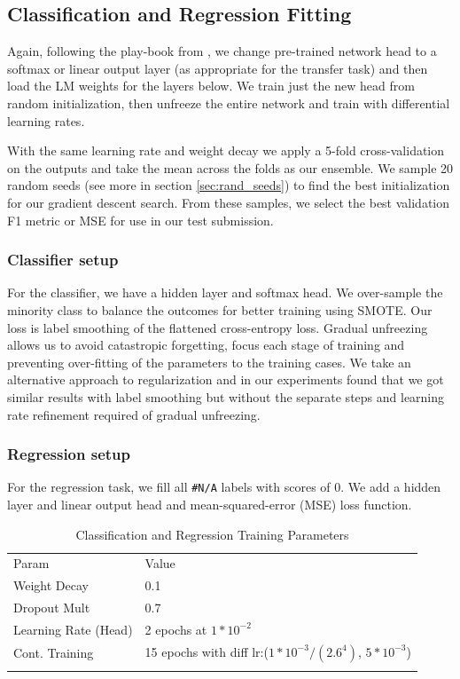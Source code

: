 \documentclass[runningheads]{llncs}
\begin{document}
\subsection{Classification and Regression Fitting}
Again, following the play-book from \cite{HowardRuder:DBLP:journals/corr/abs-1801-06146}, we change pre-trained network head to a softmax or linear output layer (as appropriate for the transfer task) and then load the LM weights for the layers below.  We train just the new head from random initialization, then unfreeze the entire network and train with differential learning rates.

With the same learning rate and weight decay we apply a 5-fold cross-validation on the outputs and take the mean across the folds as our ensemble.  We sample 20 random seeds (see more in section \ref{sec:rand_seeds}) to find the best initialization for our gradient descent search.  From these samples, we select the best validation F1 metric or MSE for use in our test submission.
\subsubsection{Classifier setup}  For the classifier, we have a hidden layer and softmax head.  We over-sample the minority class to balance the outcomes for better training using SMOTE\cite{Chawla:2002:SSM:1622407.1622416}.  Our loss is label smoothing\cite{Labelsmoothing:DBLP:journals/corr/PereyraTCKH17} of the flattened cross-entropy loss.  Gradual unfreezing allows us to avoid catastropic forgetting, focus each stage of training and preventing over-fitting of the parameters to the training cases.  We take an alternative approach to regularization and in our experiments found that we got similar results with label smoothing but without the separate steps and learning rate refinement required of gradual unfreezing.   
\subsubsection{Regression setup}  For the regression task, we fill all \verb|#N/A| labels with scores of 0.  We add a hidden layer and linear output head and mean-squared-error (MSE) loss function. 

\begin{table}[ht]
	\caption{Classification and Regression Training Parameters}
	\label{tab:clas_training}       %
	\begin{tabular}{ll}
		\hline\noalign{\smallskip}
		Param & Value \\
		\noalign{\smallskip}\hline\noalign{\smallskip}
		Weight Decay & 0.1  \\
		Dropout Mult &  0.7 \\
		Learning Rate (Head)& 2 epochs at $1*10^{-2}$\\
		Cont. Training & 15 epochs with diff lr:($1*10^{-3}/(2.6^4)$, $5*10^{-3}$)\\
		\noalign{\smallskip}\hline
	\end{tabular}
\end{table}
\end{document}
